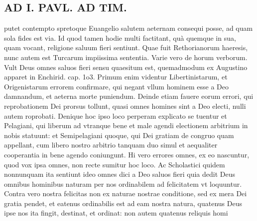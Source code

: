 \documentclass{article}
\begin{document}
\begin{pages}
\section*{AD I. PAVL. AD TIM. }
\marginpar{[ p.54 ]}\pstart putet contempto spretoque Euangelio salutem aeternam consequi posse, ad quam sola fides est via. Id quod tamen hodie multi factitant, quà quemque in sua, quam vocant, religione saluum fieri sentiunt. Quae fuit Rethorianorum haeresis, nunc autem est Turcarum impiissima sententia. Varie vero de horum verborum. Vult Deus omnes saluos fieri sensu quaesitum est, quemadmodum ex Augustino apparet in Enchirid. cap. 1o3. Primum enim videntur Libertinistarum, et Origenistarum errorem confirmare, qui negant vllum hominem esse a Deo damnandum, et aeterna morte puniendum. Deinde etiam fauere eorum errori, qui reprobationem Dei prorsus tollunt, quasi omnes homines sint a Deo electi, nulli autem roprobati. Denique hoc ipso loco perperam explicato se tuentur et Pelagiani, qui liberum ad vtranque bene et male agendi electionem arbitrium in nobis statuunt: et Semipelagiani quoque, qui Dei gratiam de congruo quam appellant, cum libero nostro arbitrio tanquam duo simul et aequaliter cooperantia in bene agendo coniungunt. Hi vero errores omnes, ex eo nascuntur, quod vox ipsa omnes, non recte sumitur hoc loco. Ac Scholastici quidem nonnunquam ita sentiunt ideo omnes dici a Deo saluos fieri quia dedit Deus omnibus hominibus naturam per nos ordinabilem ad felicitatem vt loquuntur. Contra vero nostra felicitas non ex naturae nostrae conditione, sed ex mera Dei gratia pendet, et eatenus ordinabilis est ad eam nostra natura, quatenus Deus ipse nos ita fingit, destinat, et ordinat: non autem quatenus reliquis homi\pend

\end{pages}
\end{document}
